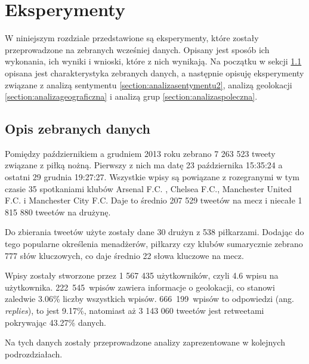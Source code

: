 \chapter{Eksperymenty}
W niniejszym rozdziale przedstawione są eksperymenty, które zostały
przeprowadzone na zebranych wcześniej danych.
Opisany jest sposób ich wykonania, ich wyniki i wnioski, które z nich wynikają.
Na początku w sekcji \ref{section:opisdanych} opisana jest charakterystyka
zebranych danych, a następnie opisuję eksperymenty związane z analizą sentymentu
\ref{section:analizasentymentu2}, analizą geolokacji
\ref{section:analizageograficzna} i analizą grup \ref{section:analizaspoleczna}.














\section{Opis zebranych danych}
\label{section:opisdanych}

Pomiędzy październikiem a grudniem 2013 roku zebrano 7 263 523 tweety związane
z piłką nożną. Pierwszy z nich ma datę 23 października 15:35:24 a ostatni
29 grudnia 19:27:27. Wszystkie wpisy są powiązane z rozegranymi w tym czasie
35 spotkaniami klubów Arsenal F.C. , Chelsea F.C., Manchester United F.C. i
Manchester City F.C. Daje to średnio 207 529 tweetów na mecz i niecałe
1 815 880 tweetów na drużynę.

Do zbierania tweetów użyte zostały dane 30 drużyn z 538 piłkarzami.
Dodając do tego popularne określenia menadżerów, piłkarzy czy klubów sumarycznie
zebrano 777 słów kluczowych, co daje średnio 22 słowa kluczowe na mecz.

Wpisy zostały stworzone przez 1 567 435 użytkowników, czyli 4.6 
wpisu na użytkownika. \mbox{222 545 wpisów} zawiera informacje o geolokacji, co stanowi
zaledwie 3.06\% liczby wszystkich wpisów. \mbox{666 199 wpisów} to odpowiedzi 
(ang. \textit{replies}), to jest 9.17\%, natomiast aż 3 143 060 tweetów
jest retweetami pokrywając 43.27\% danych.

Na tych danych zostały przeprowadzone analizy zaprezentowane w kolejnych podrozdziałach.













